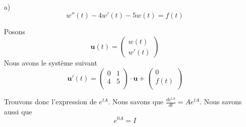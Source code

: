 \documentclass{article}
\begin{document}
\begin{enumerate}
  \item[a)]
    \begin{equation}
      w''(t)-4w'(t)-5w(t)=f(t)
    \end{equation}

    Posons
    \begin{equation}
      \bm{u}(t) = \left(
        \begin{matrix}
          w(t)\\w'(t)
        \end{matrix}
      \right)
    \end{equation}
    Nous avons le système suivant
    \begin{equation}
      \bm{u}'(t) = \left(
        \begin{matrix}
          0&1 \\
          4&5 \\
        \end{matrix}
      \right) \cdot \bm{u}+\left(
        \begin{matrix}
          0 \\
          f(t) \\
        \end{matrix}
      \right)
    \end{equation}

    Trouvons donc l'expression de $e^{tA}$. Nous savons que $\frac{de^{tA}}{dt} = Ae^{tA}$. Nous savons aussi que
    \begin{equation}
      e^{0A} = I
    \end{equation}


\end{enumerate}
\end{document}
